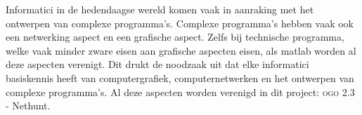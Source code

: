 Informatici in de hedendaagse wereld komen vaak in aanraking met het ontwerpen van complexe programma's. Complexe programma's hebben vaak ook een netwerking aspect en een grafische aspect. Zelfs bij technische programma, welke vaak minder zware eisen aan grafische aspecten eisen, als matlab worden al deze aspecten verenigt. Dit drukt de noodzaak uit dat elke informatici basiskennis heeft van computergrafiek, computernetwerken en het ontwerpen van complexe programma's. Al deze aspecten worden verenigd in dit project: \textsc{ogo} 2.3 - Nethunt.